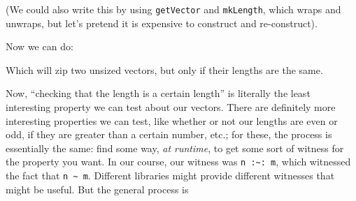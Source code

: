 \documentclass[]{article}
\newenvironment{Shaded}{}{}
\newcommand{\KeywordTok}[1]{\textcolor[rgb]{0.00,0.44,0.13}{\textbf{#1}}}
\newcommand{\DataTypeTok}[1]{\textcolor[rgb]{0.56,0.13,0.00}{#1}}
\newcommand{\CommentTok}[1]{\textcolor[rgb]{0.38,0.63,0.69}{\textit{#1}}}
\newcommand{\OtherTok}[1]{\textcolor[rgb]{0.00,0.44,0.13}{#1}}
\newcommand{\FunctionTok}[1]{\textcolor[rgb]{0.02,0.16,0.49}{#1}}
\newcommand{\NormalTok}[1]{#1}
\begin{document}
(We could also write this by using \texttt{getVector} and \texttt{mkLength},
which wraps and unwraps, but let's pretend it is expensive to construct and
re-construct).

Now we can do:

\begin{Shaded}
\end{Shaded}

Which will zip two unsized vectors, but only if their lengths are the same.

Now, ``checking that the length is a certain length'' is literally the least
interesting property we can test about our vectors. There are definitely more
interesting properties we can test, like whether or not our lengths are even or
odd, if they are greater than a certain number, etc.; for these, the process is
essentially the same: find some way, \emph{at runtime}, to get some sort of
witness for the property you want. In our course, our witness was
\texttt{n\ :\textasciitilde{}:\ m}, which witnessed the fact that
\texttt{n\ \textasciitilde{}\ m}. Different libraries might provide different
witnesses that might be useful. But the general process is
\end{document}
